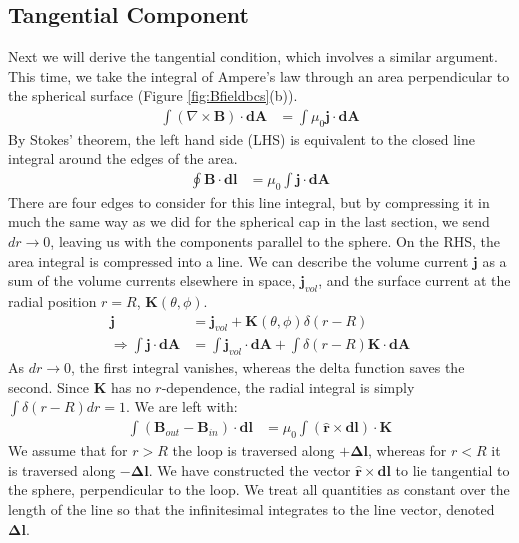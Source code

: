 \documentclass{article}
\begin{document}
\subsection*{Tangential Component}
Next we will derive the tangential condition, which involves a similar argument. This time, we take the integral of Ampere's law through an area perpendicular to the spherical surface (Figure \ref{fig:Bfieldbcs}(b)).
\begin{align}
    \int(\nabla\times\mathbf{B})\cdot\mathbf{dA} &= \int\mu_0\mathbf{j}\cdot\mathbf{dA}
\end{align}
By Stokes' theorem, the left hand side (LHS) is equivalent to the closed line integral around the edges of the area.
\begin{align}
    \oint\mathbf{B}\cdot\mathbf{dl} &= \mu_0\int\mathbf{j}\cdot\mathbf{dA}
\end{align}
There are four edges to consider for this line integral, but by compressing it in much the same way as we did for the spherical cap in the last section, we send $dr\rightarrow0$, leaving us with the components parallel to the sphere. On the RHS, the area integral is compressed into a line. We can describe the volume current $\mathbf{j}$ as a sum of the volume currents elsewhere in space, $\mathbf{j}_{vol}$, and the surface current at the radial position $r=R$, $\mathbf{K}(\theta,\phi)$.
\begin{align}
    \mathbf{j} &= \mathbf{j}_{vol} + \mathbf{K}(\theta,\phi)\delta(r-R) \\
    \Longrightarrow \int \mathbf{j}\cdot\mathbf{dA} &= \int\mathbf{j}_{vol}\cdot\mathbf{dA} + \int\delta(r-R)\mathbf{K}\cdot\mathbf{dA}
\end{align}
As $dr\rightarrow0$, the first integral vanishes, whereas the delta function saves the second. Since $\mathbf{K}$ has no $r$-dependence, the radial integral is simply $\int\delta(r-R)dr=1$. We are left with:
\begin{align}
    \int(\mathbf{B}_{out}-\mathbf{B}_{in})\cdot\mathbf{dl} &= \mu_0\int(\mathbf{\hat{r}}\times\mathbf{dl})\cdot\mathbf{K}
\end{align}
We assume that for $r>R$ the loop is traversed along $+\mathbf{\Delta l}$, whereas for $r<R$ it is traversed along $-\mathbf{\Delta l}$. We have constructed the vector $\mathbf{\hat{r}}\times\mathbf{dl}$ to lie tangential to the sphere, perpendicular to the loop. We treat all quantities as constant over the length of the line so that the infinitesimal integrates to the line vector, denoted $\mathbf{\Delta l}$.
\end{document}
